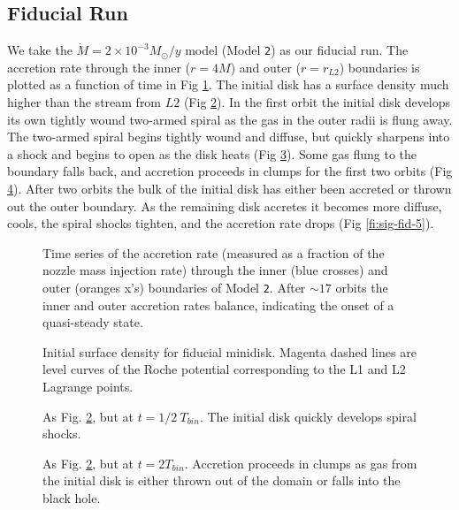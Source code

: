 \documentclass{emulateapj}
\newcommand{\model}[1]{{Model \texttt{#1}}}
\begin{document}
\subsection{Fiducial Run}
\label{subsec:fiducial}

We take the $\dot{M} = 2 \times 10^{-3} M_\odot / y$ model (\model{2}) as our fiducial run.  The accretion rate through the inner ($r=4 M$) and outer ($r=r_{L2}$) boundaries is plotted as a function of time in Fig \ref{fi:mdot-fid}. The initial disk has a surface density much higher than the stream from $L2$ (Fig \ref{fi:sig-fid-0}).  In the first orbit the initial disk develops its own tightly wound two-armed spiral as the gas in the outer radii is flung away.  The two-armed spiral begins tightly wound and diffuse, but quickly sharpens into a shock and begins to open as the disk heats (Fig \ref{fi:sig-fid-05}).  Some gas flung to the boundary falls back, and accretion proceeds in clumps for the first two orbits (Fig \ref{fi:sig-fid-2}).  After two orbits the bulk of the initial disk has either been accreted or thrown out the outer boundary.  As the remaining disk accretes it becomes more diffuse, cools, the spiral shocks tighten, and the accretion rate drops (Fig \ref{fi:sig-fid-5}).

\begin{figure}
\caption{\label{fi:mdot-fid} Time series of the accretion rate (measured as a fraction of the nozzle mass injection rate) through the inner (blue crosses) and outer (oranges x's) boundaries of \model{2}.  After $\sim17$ orbits the inner and outer accretion rates balance, indicating the onset of a quasi-steady state.}
\end{figure}

\begin{figure}
\caption{\label{fi:sig-fid-0} Initial surface density for fiducial minidisk.  Magenta dashed lines are level curves of the Roche potential corresponding to the L1 and L2 Lagrange points.}
\end{figure}

\begin{figure}
\caption{\label{fi:sig-fid-05} As Fig. \ref{fi:sig-fid-0}, but at $t = 1/2\ T_{bin}$.  The initial disk quickly develops spiral shocks.}
\end{figure}

\begin{figure}
\caption{\label{fi:sig-fid-2} As Fig. \ref{fi:sig-fid-0}, but at $t = 2 T_{bin}$.  Accretion proceeds in clumps as gas from the initial disk is either thrown out of the domain or falls into the black hole.}
\end{figure}
\end{document}
